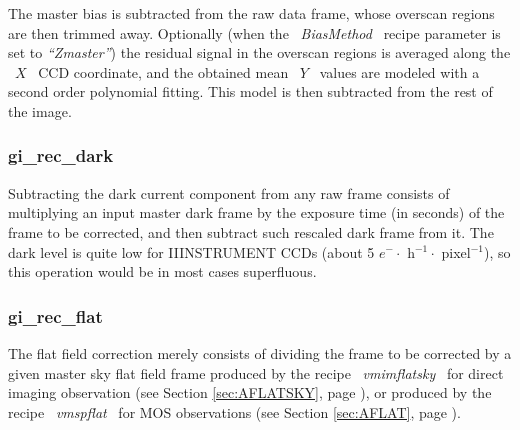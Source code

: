 The master bias is subtracted from the raw data frame, whose
overscan regions are then trimmed away. Optionally (when 
the \ {\it BiasMethod} \ recipe parameter is set to {\it ``Zmaster''})
the residual signal in the overscan regions is averaged along
the \ $X$ \ CCD coordinate, and the obtained mean \ $Y$ \ values are
modeled with a second order polynomial fitting. This model is 
then subtracted from the rest of the image.

\subsubsection{gi\_rec\_dark}
\label{sec:ADARK}

Subtracting the dark current component from any raw frame consists 
of multiplying an input master dark frame by the exposure time 
(in seconds) of the frame to be corrected, and then subtract such
rescaled dark frame from it. The dark level is quite low for IIINSTRUMENT CCDs
(about 5 $e^{-} \cdot $ h$^{-1} \cdot $ pixel$^{-1}$), so this operation
would be in most cases superfluous.

\subsubsection{gi\_rec\_flat}
\label{sec:AFLATFIELDING}
\label{sec:AFLAT}
\label{sec:AFLATSKY}

The flat field correction merely consists of dividing the frame 
to be corrected by a given master sky flat field frame produced 
by the recipe \ {\it vmimflatsky} \ for direct imaging observation
(see Section \ref{sec:AFLATSKY}, page \pageref{sec:AFLATSKY}), or produced 
by the recipe \ {\it vmspflat} \ for MOS observations (see Section 
\ref{sec:AFLAT}, page \pageref{sec:AFLAT}).

\newpage

